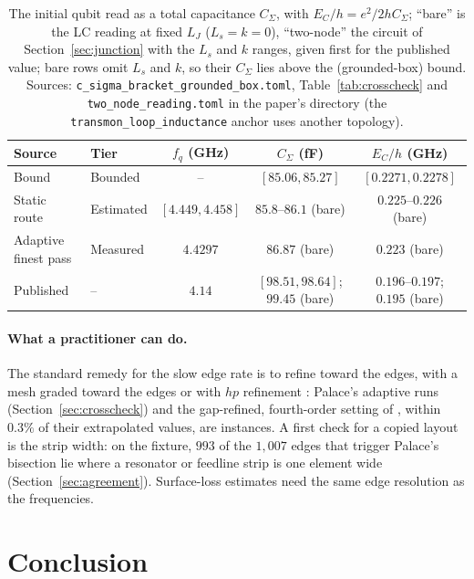 \documentclass{anvil-paper}
\begin{document}
\begin{table}[htbp]
  \centering
  \caption{The initial qubit read as a total capacitance $C_\Sigma$, with
  $E_C/h = e^2/2hC_\Sigma$; ``bare'' is the LC reading at fixed $L_J$
  ($L_s = k = 0$), ``two-node'' the circuit of
  Section~\ref{sec:junction} with the $L_s$ and $k$ ranges, given first for
  the published value; bare rows omit $L_s$ and $k$, so their $C_\Sigma$
  lies above the (grounded-box) bound. Sources:
  \texttt{c\_sigma\_bracket\_grounded\_box.toml}, Table~\ref{tab:crosscheck}
  and \texttt{two\_node\_reading.toml} in the paper's directory (the
  \texttt{transmon\_loop\_inductance} anchor uses another topology).}
  \label{tab:design}
  \footnotesize
  \begin{tabular}{@{}llccc@{}}
    \toprule
    Source & Tier & $f_q$ (GHz) & $C_\Sigma$ (fF) & $E_C/h$ (GHz) \\
    \midrule
    Bound & Bounded & -- & $[85.06, 85.27]$ & $[0.2271, 0.2278]$ \\
    Static route & Estimated & $[4.449, 4.458]$ & $85.8$--$86.1$ (bare) & $0.225$--$0.226$ (bare) \\
    Adaptive finest pass & Measured & $4.4297$ & $86.87$ (bare) & $0.223$ (bare) \\
    Published & -- & $4.14$ & $[98.51, 98.64]$; $99.45$ (bare) & $0.196$--$0.197$; $0.195$ (bare) \\
    \bottomrule
  \end{tabular}
\end{table}

\paragraph{What a practitioner can do.}
The standard remedy for the slow edge rate is to refine toward the edges,
with a mesh graded toward the edges or with $hp$ refinement
\citep{demkowicz2006computing}: Palace's adaptive runs
(Section~\ref{sec:crosscheck}) and the gap-refined, fourth-order setting of
\citet{ye2025electromagnetic}, within $0.3\%$ of their extrapolated
values, are instances.
A first check for a copied layout is the strip width: on the fixture, $993$ of the $1{,}007$
edges that trigger Palace's bisection lie where a resonator or feedline
strip is one element wide (Section~\ref{sec:agreement}). Surface-loss estimates \citep{wang2015surface,martinis2022surface} need
the same edge resolution as the frequencies.

\section{Conclusion}
\label{sec:conclusion}
\end{document}
